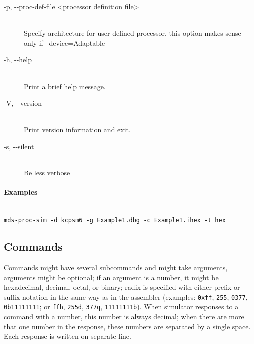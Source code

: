 \begin{description}
                \item[-p, -{}-proc-def-file <processor definition file>]~\\
                    Specify architecture for user defined processor, this option makes sense only if --device=Adaptable

                \item[-h, -{}-help]~\\
                    Print a brief help message.

                \item[-V, -{}-version]~\\
                    Print version information and exit.

                \item[-s, -{}-silent]~\\
                    Be less verbose
            \end{description}

        \paragraph{Examples}~\\
            \verb'mds-proc-sim -d kcpsm6 -g Example1.dbg -c Example1.ihex -t hex'

    \subsection{Commands}
        Commands might have several subcommands and might take arguments, arguments might be optional; if an argument is a number, it might be hexadecimal, decimal, octal, or binary; radix is specified with either prefix or suffix notation in the same way as in the assembler (examples: \texttt{0xff}, \texttt{255}, \texttt{0377}, \texttt{0b11111111}; or \texttt{ffh}, \texttt{255d}, \texttt{377q}, \texttt{11111111b}). When simulator responses to a command with a number, this number is always decimal; when there are more that one number in the response, these numbers are separated by a single space. Each response is written on separate line.


